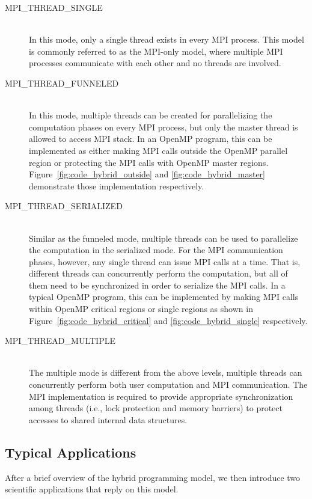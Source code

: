 \begin{description}
\item[MPI\_THREAD\_SINGLE] \hfill \\
In this mode, only a single thread exists in every MPI process. This
model is commonly referred to as the MPI-only model, where multiple
MPI processes communicate with each other and no threads are involved.

\item[MPI\_THREAD\_FUNNELED] \hfill \\
In this mode, multiple threads can be created for parallelizing the
computation phases on every MPI process, but only the master thread is
allowed to access MPI stack. In an OpenMP program, this can be implemented
as either making MPI calls outside the OpenMP parallel region or protecting
the MPI calls with OpenMP master regions. Figure~\ref{fig:code_hybrid_outside}
and \ref{fig:code_hybrid_master} demonstrate those implementation
respectively.

\item[MPI\_THREAD\_SERIALIZED] \hfill \\
Similar as the funneled mode, multiple threads can be used to parallelize
the computation in the serialized mode. For the MPI communication phases,
however, any single thread can issue MPI calls at a time. That is, different
threads can concurrently perform the computation, but all of them need to
be synchronized in order to serialize the MPI calls.  In a typical OpenMP
program, this can be implemented by making MPI calls within OpenMP critical
regions or single regions as shown in Figure~\ref{fig:code_hybrid_critical}
and \ref{fig:code_hybrid_single} respectively.

\item[MPI\_THREAD\_MULTIPLE] \hfill \\
The multiple mode is different from the above levels, multiple threads
can concurrently perform both user computation and MPI communication.
The MPI implementation is required to provide appropriate synchronization
among threads (i.e., lock protection and memory barriers) to protect
accesses to shared internal data structures.

\end{description}

\subsection{Typical Applications}
After a brief overview of the hybrid programming model, we then introduce
two scientific applications that reply on this model.

